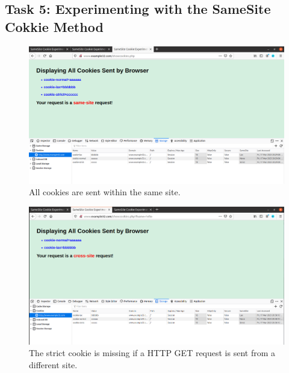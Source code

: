 \subsection{Task 5: Experimenting with the SameSite Cokkie Method}
%
\begin{figure}
    \centering
    \includegraphics[height=\textheight,width=\textwidth,keepaspectratio]
    {figures/samesite_cookie_same.png}
    \caption{All cookies are sent within the same site.}
    \label{fig:samesite_cookie}
\end{figure}

\begin{figure}
    \centering
    \includegraphics[height=\textheight,width=\textwidth,keepaspectratio]
    {figures/samesite_cookie_get_crosssite.png}
    \caption{The strict cookie is missing if a HTTP GET request is sent
    from a different site.}
    \label{fig:crosssite_cookie_get}
\end{figure}

